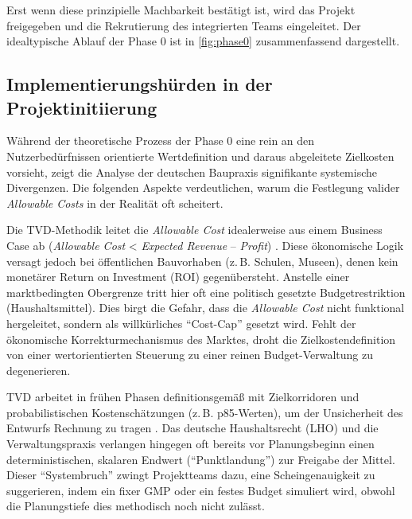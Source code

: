 Erst wenn diese prinzipielle Machbarkeit bestätigt ist, wird das Projekt freigegeben und die Rekrutierung des integrierten Teams eingeleitet. Der idealtypische Ablauf der Phase 0 ist in \cref{fig:phase0} zusammenfassend dargestellt.



\clearpage

\subsection{Implementierungshürden in der Projektinitiierung}
\label{sec:4.2.4}

Während der theoretische Prozess der Phase 0 eine rein an den Nutzerbedürfnissen orientierte Wertdefinition und daraus abgeleitete Zielkosten vorsieht, zeigt die Analyse der deutschen Baupraxis signifikante systemische Divergenzen. Die folgenden Aspekte verdeutlichen, warum die Festlegung valider \textit{Allowable Costs} in der Realität oft scheitert.

Die \acs{TVD}-Methodik leitet die \textit{Allowable Cost} idealerweise aus einem Business Case ab (\textit{Allowable Cost} < \textit{Expected Revenue} -- \textit{Profit}) \autocite[Vgl.][S.~13]{ballard_target_2012}. Diese ökonomische Logik versagt jedoch bei öffentlichen Bauvorhaben (z.\,B. Schulen, Museen), denen kein monetärer Return on Investment (\acs{ROI}) gegenübersteht.
Anstelle einer marktbedingten Obergrenze tritt hier oft eine politisch gesetzte Budgetrestriktion (Haushaltsmittel). Dies birgt die Gefahr, dass die \textit{Allowable Cost} nicht funktional hergeleitet, sondern als willkürliches \enquote{Cost-Cap} gesetzt wird. Fehlt der ökonomische Korrekturmechanismus des Marktes, droht die Zielkostendefinition von einer wertorientierten Steuerung zu einer reinen Budget-Verwaltung zu degenerieren.

\acs{TVD} arbeitet in frühen Phasen definitionsgemäß mit Zielkorridoren und probabilistischen Kostenschätzungen (z.\,B. p85-Werten), um der Unsicherheit des Entwurfs Rechnung zu tragen \autocite[Vgl.][S.~125 ff]{ballard_target_2025}.
Das deutsche Haushaltsrecht (LHO) und die Verwaltungspraxis verlangen hingegen oft bereits vor Planungsbeginn einen deterministischen, skalaren Endwert (\enquote{Punktlandung}) zur Freigabe der Mittel\autocite[Vgl.][S.~12--14]{bmvi_abschlussbericht_2015}. Dieser \enquote{Systembruch} zwingt Projektteams dazu, eine Scheingenauigkeit zu suggerieren, indem ein fixer \ac{GMP} oder ein festes Budget simuliert wird, obwohl die Planungstiefe dies methodisch noch nicht zulässt.

